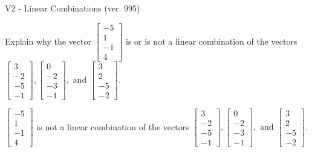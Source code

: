 \begin{exercise}
  \begin{exerciseTitle}V2 - Linear Combinations (ver. 995)\end{exerciseTitle}
  \begin{exerciseStatement}
    Explain why the vector \(\left[\begin{array}{c}
-5 \\
1 \\
-1 \\
4
\end{array}\right]\)  is or is not a linear 
	combination of the vectors \(\left[\begin{array}{c}
3 \\
-2 \\
-5 \\
-1
\end{array}\right] , \left[\begin{array}{c}
0 \\
-2 \\
-3 \\
-1
\end{array}\right] , \text{ and } \left[\begin{array}{c}
3 \\
2 \\
-5 \\
-2
\end{array}\right]\).
	


  \end{exerciseStatement}
  \begin{exerciseAnswer}
   \(\left[\begin{array}{c}
-5 \\
1 \\
-1 \\
4
\end{array}\right]\) 
  	 is not  
	a linear combination of the vectors \(\left[\begin{array}{c}
3 \\
-2 \\
-5 \\
-1
\end{array}\right] , \left[\begin{array}{c}
0 \\
-2 \\
-3 \\
-1
\end{array}\right] , \text{ and } \left[\begin{array}{c}
3 \\
2 \\
-5 \\
-2
\end{array}\right]\).

	
  


  \end{exerciseAnswer}
\end{exercise}